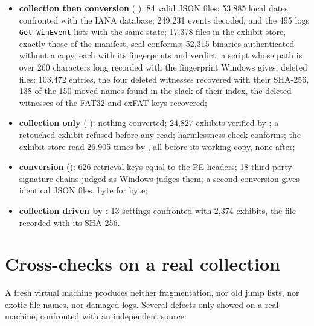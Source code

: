 \documentclass[11pt,a4paper,oneside]{report}
\begin{document}
\begin{itemize}
  \item \textbf{collection then conversion} ( 
    ): 84 valid JSON files; 53,885 local dates confronted with the
    IANA database; 249,231 events decoded, and the 495 logs
    \texttt{Get-WinEvent} lists with the same state; 17,378 files in the
    exhibit store, exactly those of the manifest, seal conforms; 52,315
    binaries authenticated without a copy, each with its fingerprints and
    verdict; a script whose path is over 260 characters long recorded with the
    fingerprint Windows gives; deleted files: 103,472 entries, the four deleted
    witnesses recovered with their SHA-256, 138 of the 150 moved names found in
    the slack of their index, the deleted witnesses of the FAT32 and exFAT keys
    recovered;
  \item \textbf{collection only} (  ):
    nothing converted; 24,827 exhibits verified by
    ; a retouched exhibit refused before any read;
    harmlessness check conforms; the exhibit store read 26,905 times by
    , all before its working copy, none after;
  \item \textbf{conversion} (): 626 retrieval keys equal to the PE
    headers; 18 third-party signature chains judged as Windows judges them; a
    second conversion gives identical JSON files, byte for byte;
  \item \textbf{collection driven by }: 13 settings
    confronted with 2,374 exhibits, the file recorded with its SHA-256.
\end{itemize}

\chapter{Cross-checks on a real collection}\label{ch:reel}

A fresh virtual machine produces neither fragmentation, nor old jump lists,
nor exotic file names, nor damaged logs. Several defects only showed on a real
machine, confronted with an independent source:
\end{document}
